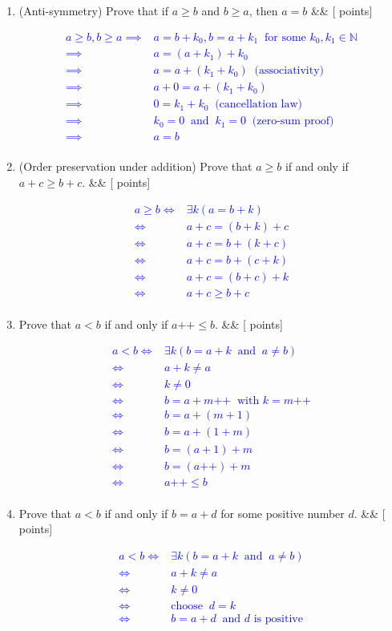 \documentclass[12pt]{article}
\newcommand{\points}[1]{\hfill {[#1 points]}}
\newcommand{\problem}[2][]{%
  \item {#2}%
  \ifx&#1&%
  \else%
    \points{#1}%
  \fi
  \par\vspace{0.5em}
}
\begin{document}
\begin{enumerate}[leftmargin=*, label=\textbf{\arabic*.}]
\begin{enumerate}
	\problem{(Anti-symmetry) Prove that if $a \geq b$ and $b \geq a$, then $a = b$}
	\textcolor{blue}{
	\begin{align*}
	a \geq b, b \geq a \implies& a = b + k_0, b = a + k_1 \;\; \text{for some $k_0,k_1 \in \mathbb{N}$}\\
	\implies& a = (a + k_1) + k_0\\
	\implies& a = a + (k_1 + k_0) \;\; \text{(associativity)}\\
	\implies& a + 0 = a + (k_1 + k_0)\\
	\implies& 0 = k_1 + k_0 \;\; \text{(cancellation law)}\\
	\implies& k_0 = 0 \;\; \text{and} \;\; k_1 = 0 \;\; \text{(zero-sum proof)}\\
	\implies& a = b\\
 	\end{align*}}
	
	\problem{(Order preservation under addition) Prove that $a \geq b$ if and only if $a+c \geq b+c$.}
	\textcolor{blue}{
	\begin{align*}
	a \geq b \iff& \exists k (a = b+k)  \\
	\iff& a + c = (b + k) + c \\
	\iff& a + c = b + (k + c) \\
	\iff& a + c = b + (c + k) \\
	\iff& a + c = (b + c) + k \\
	\iff& a + c \geq b + c \\
	\end{align*}
	}
		\problem{Prove that $a < b$ if and only if $a\text{++} \leq b$.}
		\textcolor{blue}{
		\begin{align*}
	a < b \iff& \exists k (b = a+k \;\; \text{and} \;\; a \neq b)  \\
	\iff& a + k \neq a\\
	\iff& k \neq 0\\
	\iff& b = a + m\text{++} \;\; \text{with $k = m\text{++}$}\\
	\iff& b = a + (m+1)\\	
	\iff& b = a + (1+m)\\
	\iff& b = (a + 1)+m\\
	\iff& b = (a\text{++}) + m\\	
	\iff& a\text{++} \leq b\\	
	\end{align*}}
		
		\problem{Prove that $a < b$ if and only if $b = a + d$ for some positive number $d$.}
		\textcolor{blue}{
		\begin{align*}
	a < b \iff& \exists k (b = a+k \;\; \text{and} \;\; a \neq b)  \\
	\iff& a + k \neq a\\
	\iff& k \neq 0\\
	\iff& \text{choose} \;\; d = k\\
	\iff& b = a + d \;\; \text{and $d$ is positive}\\
	\end{align*}}
	

\end{enumerate}
\end{enumerate}
\end{document}
